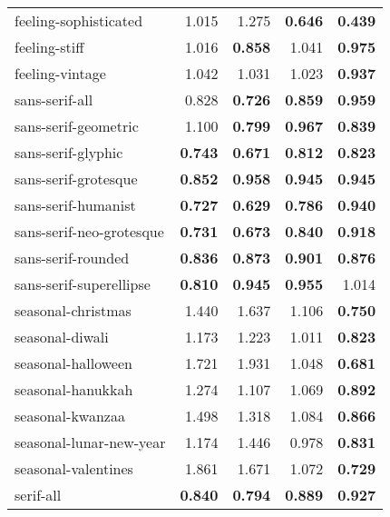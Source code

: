 \begin{longtable}{|l|r|r|r|r|}
feeling-sophisticated     & 1.015          & 1.275          & \textbf{0.646} & \textbf{0.439} \\
feeling-stiff             & 1.016          & \textbf{0.858} & 1.041          & \textbf{0.975} \\
feeling-vintage           & 1.042          & 1.031          & 1.023          & \textbf{0.937} \\
sans-serif-all            & 0.828          & \textbf{0.726} & \textbf{0.859} & \textbf{0.959} \\
sans-serif-geometric      & 1.100          & \textbf{0.799} & \textbf{0.967} & \textbf{0.839} \\
sans-serif-glyphic        & \textbf{0.743} & \textbf{0.671} & \textbf{0.812} & \textbf{0.823} \\
sans-serif-grotesque      & \textbf{0.852} & \textbf{0.958} & \textbf{0.945} & \textbf{0.945} \\
sans-serif-humanist       & \textbf{0.727} & \textbf{0.629} & \textbf{0.786} & \textbf{0.940} \\
sans-serif-neo-grotesque  & \textbf{0.731} & \textbf{0.673} & \textbf{0.840} & \textbf{0.918} \\
sans-serif-rounded        & \textbf{0.836} & \textbf{0.873} & \textbf{0.901} & \textbf{0.876} \\
sans-serif-superellipse   & \textbf{0.810} & \textbf{0.945} & \textbf{0.955} & 1.014          \\
seasonal-christmas        & 1.440          & 1.637          & 1.106          & \textbf{0.750} \\
seasonal-diwali           & 1.173          & 1.223          & 1.011          & \textbf{0.823} \\
seasonal-halloween        & 1.721          & 1.931          & 1.048          & \textbf{0.681} \\
seasonal-hanukkah         & 1.274          & 1.107          & 1.069          & \textbf{0.892} \\
seasonal-kwanzaa          & 1.498          & 1.318          & 1.084          & \textbf{0.866} \\
seasonal-lunar-new-year   & 1.174          & 1.446          & 0.978          & \textbf{0.831} \\
seasonal-valentines       & 1.861          & 1.671          & 1.072          & \textbf{0.729} \\
serif-all                 & \textbf{0.840} & \textbf{0.794} & \textbf{0.889} & \textbf{0.927} \\

\end{longtable}
